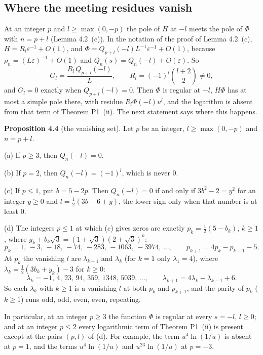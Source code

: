 \documentclass[11pt]{article}
\begin{document}
\subsection{Where the meeting residues vanish}\label{sec:chain}

At an integer $p$ and $l\ge\max(0,-p)$ the pole of $H$ at $-l$ meets the pole of $\Phi$ with $n=p+l$ (Lemma 4.2~(c)). In the notation of the proof of Lemma 4.2~(c), $H=R_l\varepsilon^{-1}+O(1)$, and $\Phi=Q_{p+l}(-l)L^{-1}\varepsilon^{-1}+O(1)$, because $\rho_n=(L\varepsilon)^{-1}+O(1)$ and $Q_n(s)=Q_n(-l)+O(\varepsilon)$. So
\[
G_l=\frac{R_l\,Q_{p+l}(-l)}{L},\qquad R_l=(-1)^l\binom{l+2}{2}\ne0,
\]
and $G_l=0$ exactly when $Q_{p+l}(-l)=0$. Then $\Phi$ is regular at $-l$, $H\Phi$ has at most a simple pole there, with residue $R_l\Phi(-l)u^l$, and the logarithm is absent from that term of Theorem P1~(ii). The next statement says where this happens.

\medskip
\noindent\textbf{Proposition 4.4} (the vanishing set). Let $p$ be an integer, $l\ge\max(0,-p)$ and $n=p+l$.

(a) If $p\ge3$, then $Q_n(-l)=0$.

(b) If $p=2$, then $Q_n(-l)=(-1)^l$, which is never $0$.

(c) If $p\le1$, put $b=5-2p$. Then $Q_n(-l)=0$ if and only if $3b^2-2=y^2$ for an integer $y\ge0$ and $l=\frac12(3b-6\pm y)$, the lower sign only when that number is at least $0$.

(d) The integers $p\le1$ at which (c) gives zeros are exactly $p_k=\frac12(5-b_k)$, $k\ge1$, where $y_k+b_k\sqrt3=(1+\sqrt3)(2+\sqrt3)^k$:
\[
p_k=1,\,-3,\,-18,\,-74,\,-283,\,-1063,\,-3974,\,\dots,\qquad p_{k+1}=4p_k-p_{k-1}-5.
\]
At $p_k$ the vanishing $l$ are $\lambda_{k-1}$ and $\lambda_k$ (for $k=1$ only $\lambda_1=4$), where $\lambda_k=\frac12(3b_k+y_k)-3$ for $k\ge0$:
\[
\lambda_k=-1,\,4,\,23,\,94,\,359,\,1348,\,5039,\,\dots,\qquad \lambda_{k+1}=4\lambda_k-\lambda_{k-1}+6.
\]
So each $\lambda_k$ with $k\ge1$ is a vanishing $l$ at both $p_k$ and $p_{k+1}$, and the parity of $p_k$ ($k\ge1$) runs odd, odd, even, even, repeating.

In particular, at an integer $p\ge3$ the function $\Phi$ is regular at every $s=-l$, $l\ge0$; and at an integer $p\le2$ every logarithmic term of Theorem P1~(ii) is present except at the pairs $(p,l)$ of (d). For example, the term $u^4\ln(1/u)$ is absent at $p=1$, and the terms $u^4\ln(1/u)$ and $u^{23}\ln(1/u)$ at $p=-3$.
\end{document}
